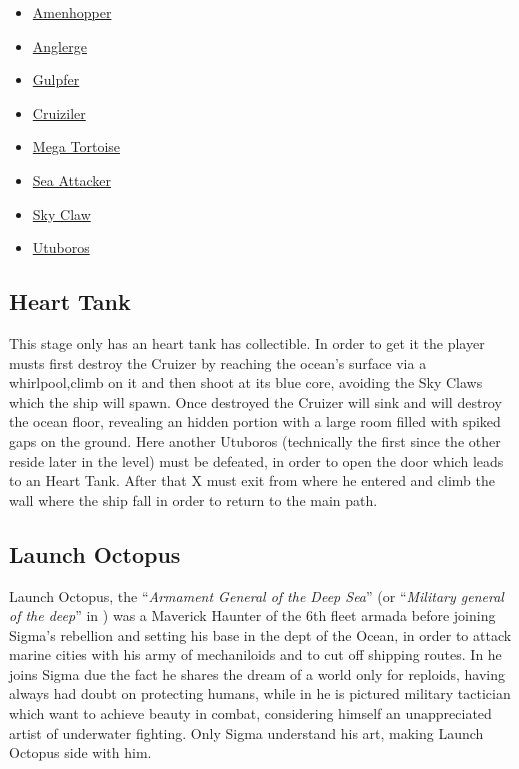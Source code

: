 \begin{itemize}
	\item \hyperlink{enem:Amenhopper}{Amenhopper}
	\item \hyperlink{miniboss:Anglerge}{Anglerge}
	\item \hyperlink{enem:Gulpfer}{Gulpfer }
	\item \hyperlink{enem:Cruiziler}{Cruiziler}
	\item \hyperlink{enem:Mega_Tortoise}{Mega Tortoise }
	\item \hyperlink{enem:Sea_Attacker}{Sea Attacker}
	\item \hyperlink{enem:Sky_Claw}{Sky Claw }
	\item \hyperlink{miniboss:Utuboros}{Utuboros }
\end{itemize}

\subsection{Heart Tank}
This stage only has an heart tank has collectible. In order to get it the player musts first destroy the Cruizer by reaching the ocean's surface via a whirlpool,climb on it and then shoot at its blue core, avoiding the Sky Claws which the ship will spawn. Once destroyed the Cruizer will sink and will destroy the ocean floor, revealing an hidden portion with a large room filled with spiked gaps on the ground. Here another Utuboros (technically the first since the other reside later in the level) must be defeated, in order to open the door which leads to an Heart Tank. After that X must exit from where he entered and climb the wall where the ship fall in order to return to the main path.
\subsection{Launch Octopus}
Launch Octopus, the ``\textit{Armament General of the Deep Sea}''\cite{wayback:X_resources} (or ``\textit{Military general of the deep}''\cite{MHX:manual} in \mhx) was a Maverick Haunter of the 6th fleet armada before joining Sigma's rebellion and setting his base in the dept of the Ocean, in order to attack marine cities with his army of mechaniloids and to cut off shipping routes. In \x he joins Sigma due the fact he shares the dream of a world only for reploids, having always had doubt on protecting humans, while in \mhx he is pictured military tactician which want to achieve beauty in combat, considering himself an unappreciated artist of underwater fighting. Only Sigma understand his art, making Launch Octopus side with him\cite{wiki:MM_MHX_script}.

